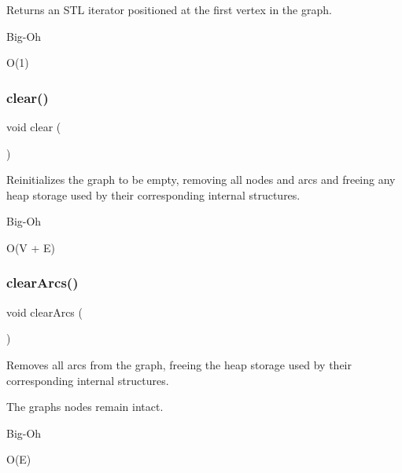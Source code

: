 Returns an S\+TL iterator positioned at the first vertex in the graph. 

\begin{DoxyRefDesc}{Big-\/\+Oh}
\item[\mbox{\hyperlink{BigOh__BigOh000091}{Big-\/\+Oh}}]O(1) \end{DoxyRefDesc}
\mbox{\label{classGraph_ac8bb3912a3ce86b15842e79d0b421204}} 
\subsubsection{\texorpdfstring{clear()}{clear()}}
{\footnotesize\ttfamily void clear (\begin{DoxyParamCaption}{ }\end{DoxyParamCaption})}



Reinitializes the graph to be empty, removing all nodes and arcs and freeing any heap storage used by their corresponding internal structures. 

\begin{DoxyRefDesc}{Big-\/\+Oh}
\item[\mbox{\hyperlink{BigOh__BigOh000049}{Big-\/\+Oh}}]O(V + E) \end{DoxyRefDesc}
\mbox{\label{classGraph_a63f0ce1806df1c8070d997153363eecb}} 
\subsubsection{\texorpdfstring{clear\+Arcs()}{clearArcs()}\hspace{0.1cm}{\footnotesize\ttfamily [1/3]}}
{\footnotesize\ttfamily void clear\+Arcs (\begin{DoxyParamCaption}{ }\end{DoxyParamCaption})}



Removes all arcs from the graph, freeing the heap storage used by their corresponding internal structures. 

The graph\textquotesingle{}s nodes remain intact. \begin{DoxyRefDesc}{Big-\/\+Oh}
\item[\mbox{\hyperlink{BigOh__BigOh000050}{Big-\/\+Oh}}]O(\+E) \end{DoxyRefDesc}
\mbox{\label{classGraph_a14def9e68896088fec7839e5da4fed27}} 
